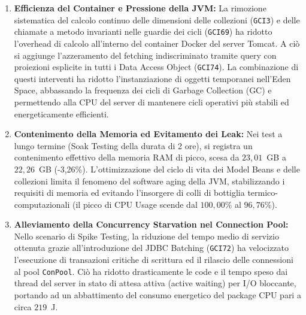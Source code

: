 \begin{enumerate}
    \item \textbf{Efficienza del Container e Pressione della JVM:}
    La rimozione sistematica del calcolo continuo delle dimensioni delle collezioni (\texttt{GCI3}) e delle chiamate a metodo invarianti nelle guardie dei cicli (\texttt{GCI69}) ha ridotto l'overhead di calcolo all'interno del container Docker del server Tomcat. A ciò si aggiunge l'azzeramento del fetching indiscriminato tramite query con proiezioni esplicite in tutti i Data Access Object (\texttt{GCI74}). La combinazione di questi interventi ha ridotto l'instanziazione di oggetti temporanei nell'Eden Space, abbassando la frequenza dei cicli di Garbage Collection (GC) e permettendo alla CPU del server di mantenere cicli operativi più stabili ed energeticamente efficienti.
    
    \item \textbf{Contenimento della Memoria ed Evitamento dei Leak:}
    Nei test a lungo termine (Soak Testing della durata di 2 ore), si registra un contenimento effettivo della memoria RAM di picco, scesa da $23,01$~GB a $22,26$~GB (-3,26\%). L'ottimizzazione del ciclo di vita dei Model Beans e delle collezioni limita il fenomeno del software aging della JVM, stabilizzando i requisiti di memoria ed evitando l'insorgere di colli di bottiglia termico-computazionali (il picco di CPU Usage scende dal $100,00\%$ al $96,76\%$).
    
    \item \textbf{Alleviamento della Concurrency Starvation nel Connection Pool:}
    Nello scenario di Spike Testing, la riduzione del tempo medio di servizio ottenuta grazie all'introduzione del JDBC Batching (\texttt{GCI72}) ha velocizzato l'esecuzione di transazioni critiche di scrittura ed il rilascio delle connessioni al pool \texttt{ConPool}. Ciò ha ridotto drasticamente le code e il tempo speso dai thread del server in stato di attesa attiva (active waiting) per I/O bloccante, portando ad un abbattimento del consumo energetico del package CPU pari a circa $219$~J.
\end{enumerate}